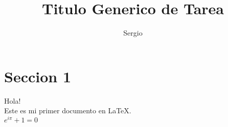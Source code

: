 \documentclass[a4paper,10pt]{article}
\title{Titulo Generico de Tarea} %
\author{Sergio} %
\begin{document}
\maketitle

% 

\section{Seccion 1}

Hola! \\ %

Este es mi primer documento en \LaTeX.\\ %

$ e^{i \pi} + 1 = 0 $  %
\end{document}

